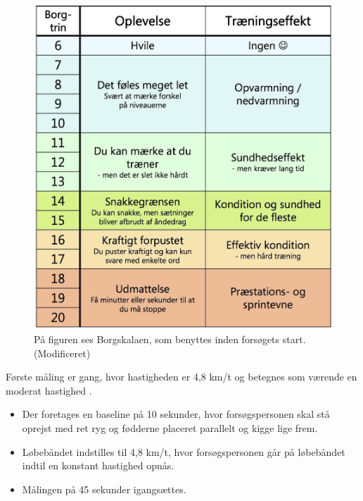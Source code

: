 \begin{figure}[H]
	\centering
	\includegraphics[scale=0.35]{figures/qBilag/Borg-skala.jpg}
	\caption{På figuren ses Borgskalaen, som benyttes inden forsøgets start. \citep{Patientinformationen2013} (Modificeret)}
	\label{fig:borgskala}
\end{figure}\vspace{-.25cm}

Første måling er gang, hvor hastigheden er 4,8 km/t og betegnes som værende en moderat hastighed \citep{Miles2007}. %
\begin{itemize}
	\item Der foretages en baseline på 10 sekunder, hvor forsøgspersonen skal stå oprejst med ret ryg og fødderne placeret parallelt og kigge lige frem.
	\item Løbebåndet indstilles til 4,8 km/t, hvor forsøgspersonen går på løbebåndet indtil en konstant hastighed opnås. 
	\item Målingen på 45 sekunder igangsættes.
\end{itemize}

